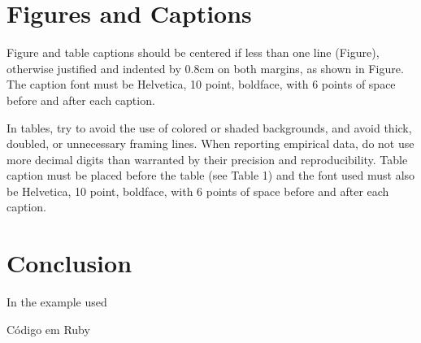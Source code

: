 \documentclass[12pt]{article}
\begin{document}
\begin{flushleft}










  
 \end{flushleft}




\section{Figures and Captions}\label{sec:figs}


Figure and table captions should be centered if less than one line
(Figure), otherwise justified and indented by 0.8cm on
both margins, as shown in Figure. The caption font must
be Helvetica, 10 point, boldface, with 6 points of space before and after each
caption.

In tables, try to avoid the use of colored or shaded backgrounds, and avoid
thick, doubled, or unnecessary framing lines. When reporting empirical data,
do not use more decimal digits than warranted by their precision and
reproducibility. Table caption must be placed before the table (see Table 1)
and the font used must also be Helvetica, 10 point, boldface, with 6 points of
space before and after each caption.
 

\section{Conclusion}

In the example used \cite{smith:99}




\newpage
Código em Ruby


\end{document}
